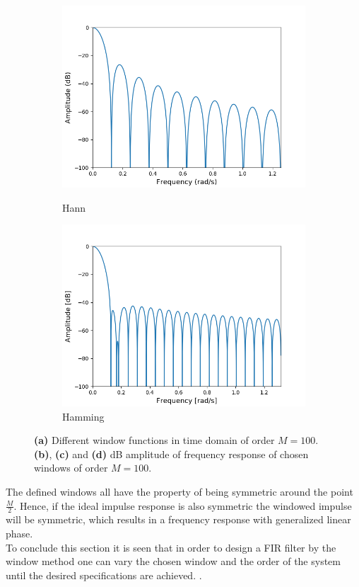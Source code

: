 \begin{figure}[H]
\begin{subfigure}{0.49\textwidth}
\includegraphics[width=\textwidth]{figures/dbplots/bartlett.png}
\caption{Hann}
\label{fig:hann_db}
\includegraphics[width=\textwidth]{figures/dbplots/hamming.png}
\caption{Hamming}
\label{fig:hamming_db}
\end{subfigure}
\caption{\textbf{(a)} Different window functions in time domain of order $M=100$. \textbf{(b)}, \textbf{(c)} and \textbf{(d)} dB amplitude of frequency response of chosen windows of order $M=100$.}
\label{fig:windows}
\end{figure}

The defined windows all have the property of being symmetric around the point $\frac{M}{2}$. Hence, if the ideal impulse response is also symmetric the windowed impulse will be symmetric, which results in a frequency response with generalized linear phase. \\
To conclude this section it is seen that in order to design a FIR filter by the window method one can vary the chosen window and the order of the system until the desired specifications are achieved. .

